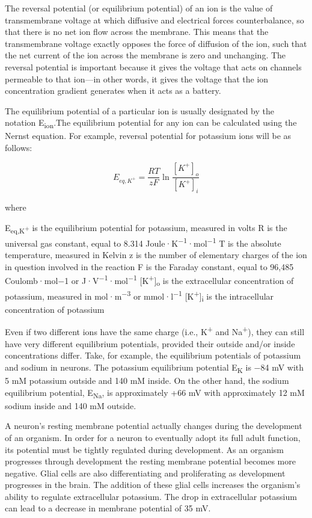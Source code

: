 The reversal potential (or equilibrium potential) of an ion is the value of transmembrane voltage at which diffusive and electrical forces counterbalance, so that there is no net ion flow across the membrane. This means that the transmembrane voltage exactly opposes the force of diffusion of the ion, such that the net current of the ion across the membrane is zero and unchanging. The reversal potential is important because it gives the voltage that acts on channels permeable to that ion---in other words, it gives the voltage that the ion concentration gradient generates when it acts as a battery.

The equilibrium potential of a particular ion is usually designated by the notation E\textsubscript{ion}.The equilibrium potential for any ion can be calculated using the Nernst equation. For example, reversal potential for potassium ions will be as follows:

\[  E_{eq,K^+} = \frac{RT}{zF} \ln \frac{[K^+]_{o}}{[K^+]_{i}} \]

where

E\textsubscript{eq,K\textsuperscript{+}} is the equilibrium potential for potassium, measured in volts
R is the universal gas constant, equal to 8.314 Joule·K\textsuperscript{−1}·mol\textsuperscript{−1}
T is the absolute temperature, measured in Kelvin
z is the number of elementary charges of the ion in question involved in the reaction
F is the Faraday constant, equal to 96,485 Coulomb·mol−1 or J·V\textsuperscript{−1}·mol\textsuperscript{−1}
{[}K\textsuperscript{+}{]}\textsubscript{o} is the extracellular concentration of potassium, measured in mol·m\textsuperscript{−3} or mmol·l\textsuperscript{−1}
{[}K\textsuperscript{+}{]}\textsubscript{i} is the intracellular concentration of potassium

Even if two different ions have the same charge (i.e., K\textsuperscript{+} and Na\textsuperscript{+}), they can still have very different equilibrium potentials, provided their outside and/or inside concentrations differ. Take, for example, the equilibrium potentials of potassium and sodium in neurons. The potassium equilibrium potential E\textsubscript{K} is −84 mV with 5 mM potassium outside and 140 mM inside. On the other hand, the sodium equilibrium potential, E\textsubscript{Na}, is approximately +66 mV with approximately 12 mM sodium inside and 140 mM outside.

A neuron's resting membrane potential actually changes during the development of an organism. In order for a neuron to eventually adopt its full adult function, its potential must be tightly regulated during development. As an organism progresses through development the resting membrane potential becomes more negative. Glial cells are also differentiating and proliferating as development progresses in the brain. The addition of these glial cells increases the organism's ability to regulate extracellular potassium. The drop in extracellular potassium can lead to a decrease in membrane potential of 35 mV.

